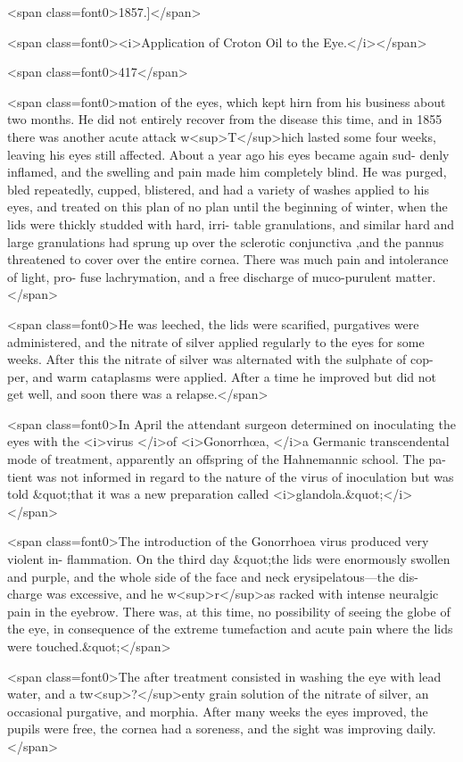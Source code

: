 <span class=font0>1857.]</span>

<span class=font0><i>Application of Croton Oil to the Eye.</i></span>

<span class=font0>417</span>

<span class=font0>mation of the eyes, which kept hirn from his business about two months.
He did not entirely recover from the disease this time, and in 1855
there was another acute attack w<sup>T</sup>hich lasted some four weeks, leaving
his eyes still affected. About a year ago his eyes became again sud-
denly inflamed, and the swelling and pain made him completely blind.
He was purged, bled repeatedly, cupped, blistered, and had a variety of
washes applied to his eyes, and treated on this plan of no plan until the
beginning of winter, when the lids were thickly studded with hard, irri-
table granulations, and similar hard and large granulations had sprung
up over the sclerotic conjunctiva ,and the pannus threatened to cover over
the entire cornea. There was much pain and intolerance of light, pro-
fuse lachrymation, and a free discharge of muco-purulent matter.</span>

<span class=font0>He was leeched, the lids were scarified, purgatives were administered,
and the nitrate of silver applied regularly to the eyes for some weeks.
After this the nitrate of silver was alternated with the sulphate of cop-
per, and warm cataplasms were applied. After a time he improved
but did not get well, and soon there was a relapse.</span>

<span class=font0>In April the attendant surgeon determined on inoculating the eyes
with the <i>virus </i>of <i>Gonorrhœa, </i>a Germanic transcendental mode of
treatment, apparently an offspring of the Hahnemannic school. The pa-
tient was not informed in regard to the nature of the virus of inoculation
but was told &quot;that it was a new preparation called <i>glandola.&quot;</i></span>

<span class=font0>The introduction of the Gonorrhoea virus produced very violent in-
flammation. On the third day &quot;the lids were enormously swollen and
purple, and the whole side of the face and neck erysipelatous—the dis-
charge was excessive, and he w<sup>r</sup>as racked with intense neuralgic pain in
the eyebrow. There was, at this time, no possibility of seeing the globe of
the eye, in consequence of the extreme tumefaction and acute pain
where the lids were touched.&quot;</span>

<span class=font0>The after treatment consisted in washing the eye with lead water, and
a tw<sup>?</sup>enty grain solution of the nitrate of silver, an occasional purgative,
and morphia. After many weeks the eyes improved, the pupils were
free, the cornea had a soreness, and the sight was improving daily.</span>


